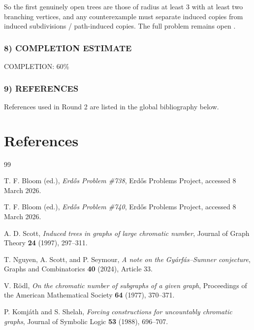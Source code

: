 So the first genuinely open trees are those of radius at least $3$ with at least two branching vertices, and any counterexample must separate induced copies from induced subdivisions / path-induced copies. The full problem remains open \cite{Bloom738}.

\subsubsection*{8) COMPLETION ESTIMATE}
COMPLETION: 60\%

\subsubsection*{9) REFERENCES}
References used in Round 2 are listed in the global bibliography below.


\section{References}
\begin{thebibliography}{99}

T. F. Bloom (ed.), \emph{Erd\H{o}s Problem \#738}, Erd\H{o}s Problems Project, accessed 8 March 2026.

T. F. Bloom (ed.), \emph{Erd\H{o}s Problem \#740}, Erd\H{o}s Problems Project, accessed 8 March 2026.

A. D. Scott, \emph{Induced trees in graphs of large chromatic number}, Journal of Graph Theory \textbf{24} (1997), 297--311.

T. Nguyen, A. Scott, and P. Seymour, \emph{A note on the Gy\'{a}rf\'{a}s--Sumner conjecture}, Graphs and Combinatorics \textbf{40} (2024), Article 33.

V. R\"{o}dl, \emph{On the chromatic number of subgraphs of a given graph}, Proceedings of the American Mathematical Society \textbf{64} (1977), 370--371.

P. Komj\'{a}th and S. Shelah, \emph{Forcing constructions for uncountably chromatic graphs}, Journal of Symbolic Logic \textbf{53} (1988), 696--707.

\end{thebibliography}
